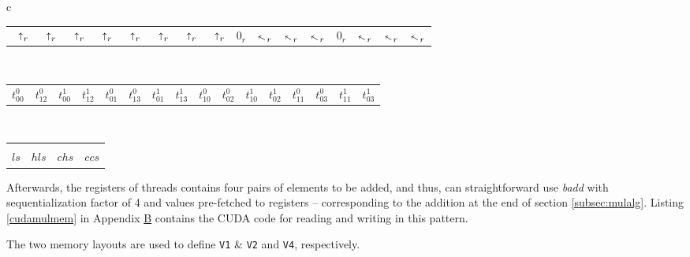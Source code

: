 \begin{center}
\begin{tabular}{c}
    \begin{tabular}{C{0.46cm}C{0.46cm}C{0.46cm}C{0.46cm}C{0.5cm}C{0.46cm}C{0.46cm}C{0.46cm}C{0.5cm}C{0.46cm}C{0.46cm}C{0.46cm}C{0.5cm}C{0.46cm}C{0.46cm}C{0.46cm}}
      $\,~\shortuparrow_r$ & $\,~\shortuparrow_{r}$ & $\,~\shortuparrow_{r}$ & $\,~\shortuparrow_{r}$ & $\,~\shortuparrow_{r}$ & $\,~\shortuparrow_{r}$ & $\,~\shortuparrow_{r}$  & $\,~\shortuparrow_{r}$ & \scriptsize $0_{r}$ & $\diagonalarrowleftup_{r}$ & $\diagonalarrowleftup_{r}$  & $\diagonalarrowleftup_{r}$  & \scriptsize $0_{r}$ & $\diagonalarrowleftup_{r}$  & $\diagonalarrowleftup_{r}$ & $\diagonalarrowleftup_{r}$
    \end{tabular}\\
    \begin{tabular}{C{0.46cm}C{0.46cm}C{0.46cm}C{0.46cm}C{0.46cm}C{0.46cm}C{0.46cm}C{0.46cm}C{0.46cm}C{0.46cm}C{0.46cm}C{0.46cm}C{0.46cm}C{0.46cm}C{0.46cm}C{0.46cm}}
      \color{Crimson}$t^0_{00}$ & \color{Crimson}$t^0_{12}$ & \color{RoyalBlue}$t^1_{00}$ & \color{RoyalBlue}$t^1_{12}$ & \color{Crimson}$t^0_{01}$ & \color{Crimson}$t^0_{13}$ & \color{RoyalBlue}$t^1_{01}$ & \color{RoyalBlue}$t^1_{13}$ & \color{Crimson}$t^0_{10}$ & \color{Crimson}$t^0_{02}$ & \color{RoyalBlue}$t^1_{10}$ & \color{RoyalBlue}$t^1_{02}$ & \color{Crimson}$t^0_{11}$ & \color{Crimson}$t^0_{03}$ & \color{RoyalBlue}$t^1_{11}$ & \color{RoyalBlue}$t^1_{03}$
    \end{tabular}\\[-0.5ex]
    \begin{tabular}{C{3.2cm}C{3.2cm}C{3.2cm}C{3.2cm}}
      \upbracefill & \upbracefill & \upbracefill & \upbracefill\\[-0.3ex]
      $\mathit{ls}$ & $\mathit{hls}$ & $\mathit{chs}$ & $\mathit{ccs}$
    \end{tabular}
  \end{tabular}
\end{center}
Afterwards, the registers of threads contains four pairs of elements to be
added, and thus, can straightforward use \textit{badd} with sequentialization
factor of 4 and values pre-fetched to registers -- corresponding to the addition
at the end of section \ref{subsec:mulalg}. Listing \ref{cudamulmem} in Appendix
\hyperref[app:B]{B} contains the CUDA code for reading and writing in this
pattern.

The two memory layouts are used to define \texttt{V1} \& \texttt{V2} and
\texttt{V4}, respectively.

